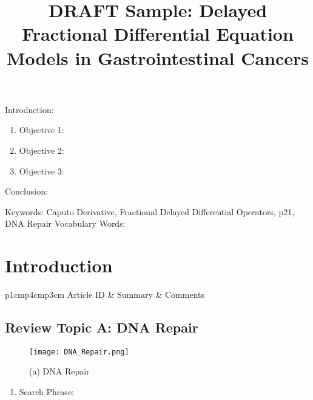 

\twocolumn
\scriptsize
\begin{frontmatter}
		\title{DRAFT Sample: Delayed Fractional Differential Equation Models in Gastrointestinal Cancers}
		\author{}
		\address{The Mathematical Learning Space}
\end{frontmatter}	

Introduction:
\begin{enumerate}
\item Objective 1:
\item Objective 2:
\item Objective 3:
\end{enumerate}
Conclusion:

Keywords: Caputo Derivative, Fractional Delayed Differential Operators, p21, DNA Repair
Vocabulary Words:

\section{Introduction}

\begin{table}[H]\centering
	\begin{tabular}{p{1cm}p{4cm}p{3cm}}
		Article ID & Summary & Comments\\
		\hline
		\hline
	\end{tabular}
\end{table}

\subsection{Review Topic A: DNA Repair}

\begin{figure}[H]
\begin{minipage}[b]{0.3\linewidth}
\texttt{[image: DNA\_Repair.png]} 
\end{minipage}\hfill
\caption{(a) DNA Repair}
\label{fig:Figure1}
\end{figure} 

\begin{enumerate}
	\item Search Phrase: \cite{key1}
\end{enumerate}

